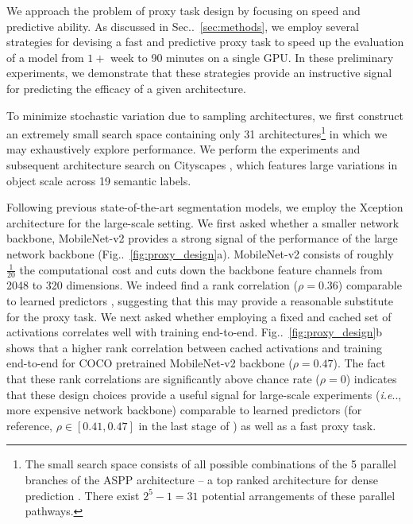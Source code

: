 \documentclass{article}
\makeatletter
\def\@onedot{\ifx\@let@token.\else.\null\fi\xspace}
\DeclareRobustCommand\onedot{\futurelet\@let@token\@onedot}
\newcommand{\figref}[1]{Fig\onedot~\ref{#1}}
\newcommand{\secref}[1]{Sec\onedot~\ref{#1}}
\def\ie{\emph{i.e}\onedot} \def\Ie{\emph{I.e}\onedot}
\makeatother
\begin{document}
We approach the problem of proxy task design by focusing on speed and predictive ability. As discussed in \secref{sec:methods}, we employ several strategies for devising a fast and predictive proxy task to speed up the evaluation of a model from $1+$ week to 90 minutes on a single GPU. In these preliminary experiments, we demonstrate that these strategies provide an instructive signal for predicting the efficacy of a given architecture.

To minimize stochastic variation due to sampling architectures, we first construct an extremely small search space containing only 31 architectures\footnote{The small search space consists of all possible combinations of the 5 parallel branches of the ASPP architecture -- a top ranked architecture for dense prediction \cite{chen2017rethinking}. There exist $2^5 - 1 = 31$ potential arrangements of these parallel pathways.} in which we may exhaustively explore performance. We perform the experiments and subsequent architecture search on Cityscapes \cite{Cordts2016Cityscapes}, which features large variations in object scale across 19 semantic labels.
















Following previous state-of-the-art segmentation models, we employ the Xception architecture \cite{chollet2016xception, dai2017coco, deeplabv3plus2018} for the large-scale setting. We first asked whether a smaller network backbone, MobileNet-v2 \cite{mobilenetv22018} provides a strong signal of the performance of the large network backbone (\figref{fig:proxy_design}a). 
MobileNet-v2 consists of roughly $\frac{1}{20}$ the computational cost and cuts down the backbone feature channels from 2048 to 320 dimensions. We indeed find a rank correlation ($\rho = 0.36$) comparable to learned predictors \cite{liu2018progressive}, suggesting that this may provide a reasonable substitute for the proxy task. We next asked whether employing a fixed and cached set of activations correlates well with training end-to-end.  \figref{fig:proxy_design}b shows that a higher rank correlation between cached activations and training end-to-end for COCO pretrained MobileNet-v2 backbone ($\rho = 0.47$). The fact that these rank correlations are significantly above chance rate ($\rho = 0$) indicates that these design choices provide a useful signal for large-scale experiments (\ie, more expensive network backbone) comparable to learned predictors \cite{liu2018progressive, zoph2017learning} (for reference, $\rho \in [0.41, 0.47]$ in the last stage of \cite{liu2018progressive}) as well as a fast proxy task.
\end{document}
